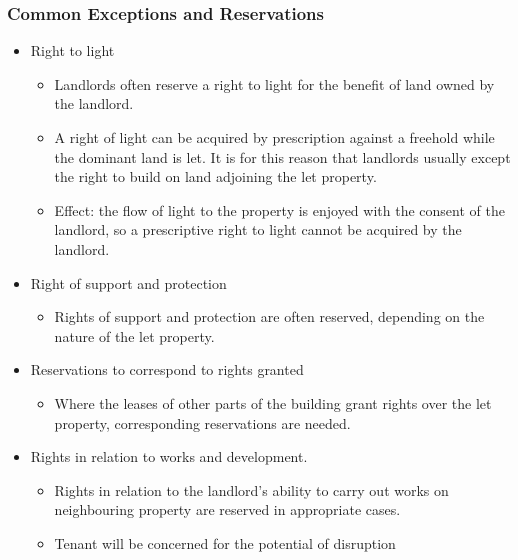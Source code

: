 \documentclass[
]{article}
\providecommand{\tightlist}{%
  \setlength{\itemsep}{0pt}\setlength{\parskip}{0pt}}
\begin{document}
\hypertarget{common-exceptions-and-reservations}{%
\subsubsection{Common Exceptions and
Reservations}\label{common-exceptions-and-reservations}}

\begin{itemize}
\tightlist
\item
  Right to light

  \begin{itemize}
  \tightlist
  \item
    Landlords often reserve a right to light for the benefit of land
    owned by the landlord.
  \item
    A right of light can be acquired by prescription against a freehold
    while the dominant land is let. It is for this reason that landlords
    usually except the right to build on land adjoining the let
    property.
  \item
    Effect: the flow of light to the property is enjoyed with the
    consent of the landlord, so a prescriptive right to light cannot be
    acquired by the landlord.
  \end{itemize}
\item
  Right of support and protection

  \begin{itemize}
  \tightlist
  \item
    Rights of support and protection are often reserved, depending on
    the nature of the let property.
  \end{itemize}
\item
  Reservations to correspond to rights granted

  \begin{itemize}
  \tightlist
  \item
    Where the leases of other parts of the building grant rights over
    the let property, corresponding reservations are needed.
  \end{itemize}
\item
  Rights in relation to works and development.

  \begin{itemize}
  \tightlist
  \item
    Rights in relation to the landlord's ability to carry out works on
    neighbouring property are reserved in appropriate cases.
  \item
    Tenant will be concerned for the potential of disruption


\end{itemize}
\end{itemize}
\end{document}
